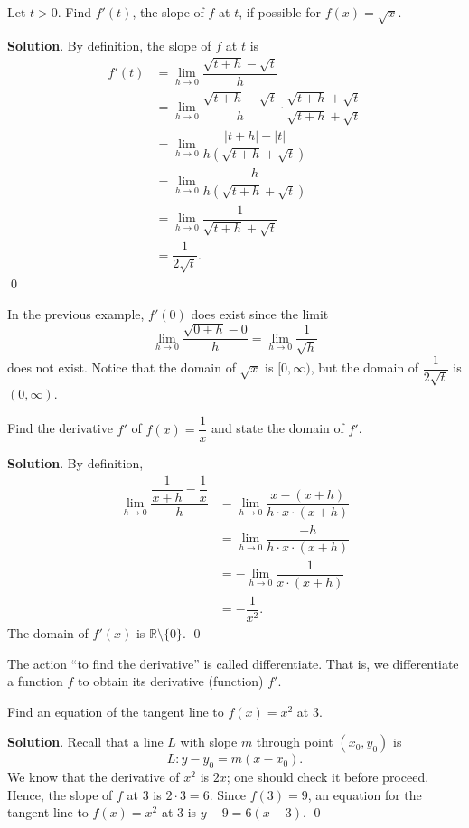 \documentclass[11pt]{book}
\theoremstyle{break}
\theoremstyle{no_label}
\newcommand{\bbR}{\mathbb{R}}
\numberwithin{equation}{section}
\begin{document}
\begin{example}
    Let $t>0$. Find $f'(t)$, the slope of $f$ at $t$, if possible for $f(x)=\sqrt{x}$.
\end{example}
\textbf{Solution}. By definition, the slope of $f$ at $t$ is \begin{align*}
    f'(t)&=\lim_{h\to 0}\dfrac{\sqrt{t+h}-\sqrt{t}}{h}\\
    &=\lim_{h\to 0}\dfrac{\sqrt{t+h}-\sqrt{t}}{h}\cdot\dfrac{\sqrt{t+h}+\sqrt{t}}{\sqrt{t+h}+\sqrt{t}}\\
    &=\lim_{h\to 0}\dfrac{|t+h|-|t|}{h(\sqrt{t+h}+\sqrt{t})}\\
    &=\lim_{h\to 0}\dfrac{h}{h(\sqrt{t+h}+\sqrt{t})}\\
    &=\lim_{h\to 0}\dfrac{1}{\sqrt{t+h}+\sqrt{t}}\\
    &=\dfrac{1}{2\sqrt{t}}.
\end{align*} \qed

\begin{remark}
    In the previous example, $f'(0)$ does exist since the limit $$\lim_{h\to 0}\dfrac{\sqrt{0+h}-0}{h}=\lim_{h\to 0}\dfrac{1}{\sqrt{h}}$$ does not exist. Notice that the domain of $\sqrt{x}$ is $[0, \infty)$, but the domain of $\dfrac{1}{2\sqrt{t}}$ is $(0, \infty)$.
\end{remark}

\begin{example}
    Find the derivative $f'$ of $f(x)=\dfrac{1}{x}$ and state the domain of $f'$.
\end{example}
\textbf{Solution}. By definition, \begin{align*}
    \lim_{h\to 0}\dfrac{\dfrac{1}{x+h}-\dfrac{1}{x}}{h}&=\lim_{h\to 0}\dfrac{x-(x+h)}{h\cdot x\cdot(x+h)}\\
    &=\lim_{h\to 0}\dfrac{-h}{h\cdot x\cdot (x+h)}\\
    &=-\lim_{h\to 0}\dfrac{1}{x\cdot(x+h)}\\
    &=-\dfrac{1}{x^2}.
\end{align*} The domain of $f'(x)$ is $\bbR\setminus\{0\}$. \qed

\begin{remark}
    The action ``to find the derivative'' is called differentiate. That is, we differentiate a function $f$ to obtain its derivative (function) $f'$.
\end{remark}

\begin{example}
    Find an equation of the tangent line to $f(x)=x^2$ at $3$.
\end{example}
\textbf{Solution}. Recall that a line $L$ with slope $m$ through point $(x_0, y_0)$ is $$L:y-y_0=m(x-x_0).$$ We know that the derivative of $x^2$ is $2x$; one should check it before proceed. Hence, the slope of $f$ at $3$ is $2\cdot 3=6$. Since $f(3)=9$, an equation for the tangent line to $f(x)=x^2$ at $3$ is $y-9=6(x-3)$. \qed
\end{document}
